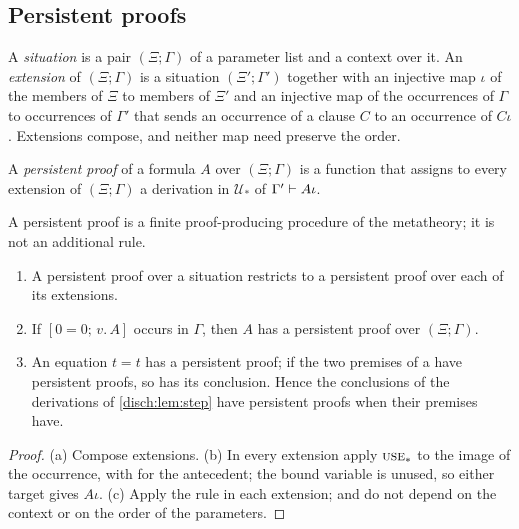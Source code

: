 \subsection{Persistent proofs}

A \emph{situation} is a pair $(\Xi;\Gamma)$ of a parameter list and a
context over it. An \emph{extension} of $(\Xi;\Gamma)$ is a situation
$(\Xi';\Gamma')$ together with an injective map $\iota$ of the members of
$\Xi$ to members of $\Xi'$ and an injective map of the occurrences of
$\Gamma$ to occurrences of $\Gamma'$ that sends an occurrence of a clause
$C$ to an occurrence of $C\iota$. Extensions compose, and neither map need
preserve the order.

\begin{definition}
\label{disch:def:persistent}
A \emph{persistent proof} of a formula $A$ over $(\Xi;\Gamma)$ is a
function that assigns to every extension of $(\Xi;\Gamma)$ a derivation
in $\mathcal U_*$ of $\Gamma'\vdash A\iota$.
\end{definition}

A persistent proof is a finite proof-producing procedure of the
metatheory; it is not an additional rule.

\begin{lemma}
\label{disch:lem:persistent}
\begin{enumerate}[label=\textup{(\alph*)}]
\item A persistent proof over a situation restricts to a persistent proof
 over each of its extensions.
\item If $[0=0;\,v.\,A]$ occurs in $\Gamma$, then $A$ has a persistent
 proof over $(\Xi;\Gamma)$.
\item An equation $t=t$ has a persistent proof; if the two premises of a
  have persistent proofs, so has its conclusion. Hence the
 conclusions of the derivations of \cref{disch:lem:step} have persistent
 proofs when their premises have.
\end{enumerate}
\end{lemma}

\begin{proof}
(a) Compose extensions. (b) In every extension apply $\rulename{Use}_*$
to the image of the occurrence, with  for the antecedent;
the bound variable is unused, so either target gives $A\iota$. (c) Apply
the rule in each extension;  and  do not
depend on the context or on the order of the parameters.
\end{proof}

